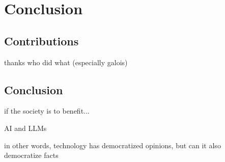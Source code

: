 \documentclass[fleqn,11pt]{report}
\theoremstyle{definition}
\begin{document}
\part{Conclusion}

\chapter{Contributions}

thanks
who did what
(especially galois)

\chapter{Conclusion}

if the society is to benefit...

AI and LLMs

in other words, technology has democratized opinions, but can it also democratize facts


























%

\end{document}
